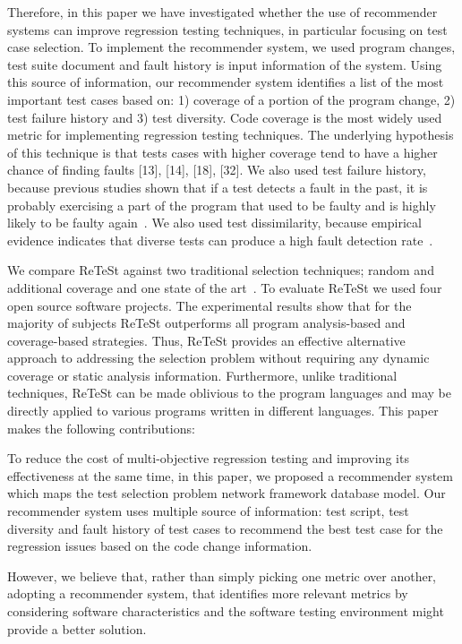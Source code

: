 Therefore, in this paper we have investigated whether the use of recommender
systems can improve regression testing techniques, in particular focusing on test case selection.
To implement the recommender system, we used program changes, test suite document and 
fault history is input information of the system. 
Using this source of information, our recommender system identifies 
a list of the most important test cases based 
on: 1) coverage of a portion of the program change, 2) test failure history and 3)
test diversity. 
Code coverage is the most widely used metric for implementing
regression testing techniques. The underlying hypothesis
of this technique is that tests cases with higher coverage
tend to have a higher chance of finding faults [13], [14],
[18], [32]. We also used test failure history, because previous studies 
shown that if a test detects a fault in the past, it
is probably exercising a part of the program that used to be faulty 
and is highly likely to be faulty again~\cite{bibid}. 
We also used test dissimilarity, because empirical
evidence indicates that diverse tests can produce a high fault
detection rate~\cite{bibid}. 


We compare ReTeSt against two traditional selection techniques; random and additional coverage and 
one state of the art~\cite{bibid}. 
To evaluate ReTeSt we used four open source software projects. 
The experimental results show that
for the majority of subjects ReTeSt outperforms all program analysis-based 
and coverage-based strategies. Thus, ReTeSt provides an
effective alternative approach to addressing the selection problem
without requiring any dynamic coverage or static analysis information. 
Furthermore, unlike traditional techniques, ReTeSt
can be made oblivious to the program languages
and may be directly applied to various
programs written in different languages. 
This paper makes the following contributions:




To reduce the cost of multi-objective regression testing
and improving its effectiveness at the same time, in this paper, we proposed a
recommender system which maps the test selection problem network framework database model.
Our recommender system uses multiple source of information:
test script, test diversity and fault history of test cases to recommend the 
best test case for the regression issues based on the code change information. 



However, we believe that, rather than simply picking one
metric over another, adopting a recommender system, that identifies
more relevant metrics by considering software characteristics and
the software testing environment might provide a better solution.







